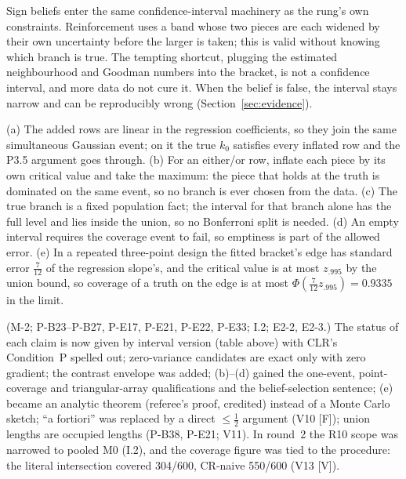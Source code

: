 \begin{plain}
Sign beliefs enter the same confidence-interval machinery as the rung's own
constraints. Reinforcement uses a band whose two pieces are each widened by their
own uncertainty before the larger is taken; this is valid without knowing which
branch is true. The tempting shortcut, plugging the estimated neighbourhood and
Goodman numbers into the bracket, is not a confidence interval, and more data do
not cure it. When the belief is false, the interval stays narrow and can be
reproducibly wrong (Section~\ref{sec:evidence}).
\end{plain}
\begin{sketch}
(a) The added rows are linear in the regression coefficients, so they join the
same simultaneous Gaussian event; on it the true $k_0$ satisfies every inflated
row and the P3.5 argument goes through. (b) For an either/or row, inflate each
piece by its own critical value and take the maximum: the piece that holds at
the truth is dominated on the same event, so no branch is ever chosen from the
data. (c) The true branch is a fixed population fact; the interval for that
branch alone has the full level and lies inside the union, so no Bonferroni
split is needed. (d) An empty interval requires the coverage event to fail, so
emptiness is part of the allowed error. (e) In a repeated three-point design the
fitted bracket's edge has standard error $\tfrac7{12}$ of the regression slope's,
and the critical value is at most $z_{.995}$ by the union bound, so coverage of a
truth on the edge is at most $\Phi(\tfrac7{12}z_{.995})=0.9335$ in the limit.
\end{sketch}
\begin{revnote}
(M-2; P-B23--P-B27, P-E17, P-E21, P-E22, P-E33; I.2; E2-2, E2-3.) The status of
each claim is now given by interval version (table above) with CLR's
Condition~P spelled out; zero-variance candidates are exact only with zero
gradient; the contrast envelope was added; (b)--(d) gained the one-event,
point-coverage and triangular-array qualifications and the belief-selection
sentence; (e) became an analytic theorem (referee's proof, credited) instead of a
Monte Carlo sketch; ``a fortiori'' was replaced by a direct $\le\tfrac12$ argument
(V10 [F]); union lengths are occupied lengths (P-B38, P-E21; V11). In round~2 the R10 scope was
narrowed to pooled M0 (I.2), and the coverage figure was tied to the procedure:
the literal intersection covered 304/600, CR-naive 550/600 (V13 [V]).
\end{revnote}

